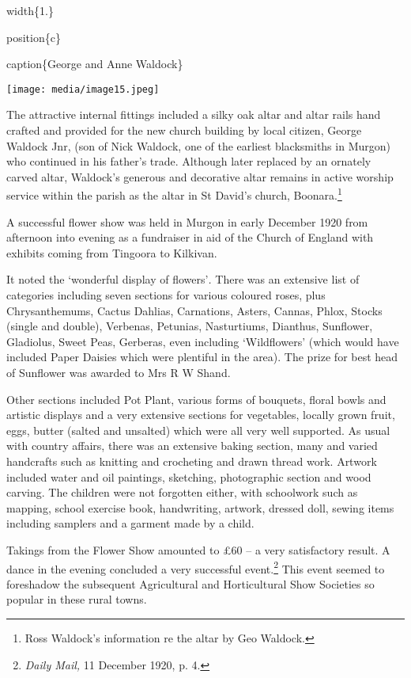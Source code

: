width\{1.\}

position\{c\}

caption\{George and Anne Waldock\}

\texttt{[image: media/image15.jpeg]}

The attractive internal fittings included a silky oak altar and altar rails hand crafted and provided for the new church building by local citizen, George Waldock Jnr, (son of Nick Waldock, one of the earliest blacksmiths in Murgon) who continued in his father's trade. Although later replaced by an ornately carved altar, Waldock's generous and decorative altar remains in active worship service within the parish as the altar in St David's church, Boonara.\footnote{Ross Waldock's information re the altar by Geo Waldock.}

A successful flower show was held in Murgon in early December 1920 from afternoon into evening as a fundraiser in aid of the Church of England with exhibits coming from Tingoora to Kilkivan.

It noted the `wonderful display of flowers'\emph{.} There was an extensive list of categories including seven sections for various coloured roses, plus Chrysanthemums, Cactus Dahlias, Carnations, Asters, Cannas, Phlox, Stocks (single and double), Verbenas, Petunias, Nasturtiums, Dianthus, Sunflower, Gladiolus, Sweet Peas, Gerberas, even including `Wildflowers' (which would have included Paper Daisies which were plentiful in the area). The prize for best head of Sunflower was awarded to Mrs R W Shand.

Other sections included Pot Plant, various forms of bouquets, floral bowls and artistic displays and a very extensive sections for vegetables, locally grown fruit, eggs, butter (salted and unsalted) which were all very well supported. As usual with country affairs, there was an extensive baking section, many and varied handcrafts such as knitting and crocheting and drawn thread work. Artwork included water and oil paintings, sketching, photographic section and wood carving. The children were not forgotten either, with schoolwork such as mapping, school exercise book, handwriting, artwork, dressed doll, sewing items including samplers and a garment made by a child.

Takings from the Flower Show amounted to £60 -- a very satisfactory result. A dance in the evening concluded a very successful event.\footnote{\emph{Daily Mail,} 11 December 1920, p. 4.} This event seemed to foreshadow the subsequent Agricultural and Horticultural Show Societies so popular in these rural towns.

